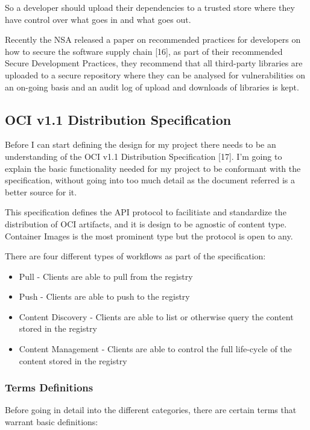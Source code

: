 \documentclass{article}
\begin{document}
  So a developer should upload their dependencies to a trusted store where they have control over what goes in and what goes out.

  Recently the NSA released a paper on recommended practices for developers on how to secure the software supply chain [16], as part of their recommended Secure Development Practices, they recommend that all third-party libraries are uploaded to a secure repository where they can be analysed for vulnerabilities on an on-going basis and an audit log of upload and downloads of libraries is kept.
  
  \subsection{OCI v1.1 Distribution Specification}

  Before I can start defining the design for my project there needs to be an understanding of the OCI v1.1 Distribution Specification [17]. I'm going to explain the basic functionality needed for my project to be conformant with the specification, without going into too much detail as the document referred is a better source for it.

  This specification defines the API protocol to facilitiate and standardize the distribution of OCI artifacts, and it is design to be agnostic of content type. Container Images is the most prominent type but the protocol is open to any.

  There are four different types of workflows as part of the specification:

  \begin{itemize}
    \item Pull - Clients are able to pull from the registry
    \item Push - Clients are able to push to the registry
    \item Content Discovery - Clients are able to list or otherwise query the content stored in the registry
    \item Content Management - Clients are able to control the full life-cycle of the content stored in the registry
  \end{itemize}
  
  \subsubsection{Terms Definitions}

  Before going in detail into the different categories, there are certain terms that warrant basic definitions:
\end{document}
